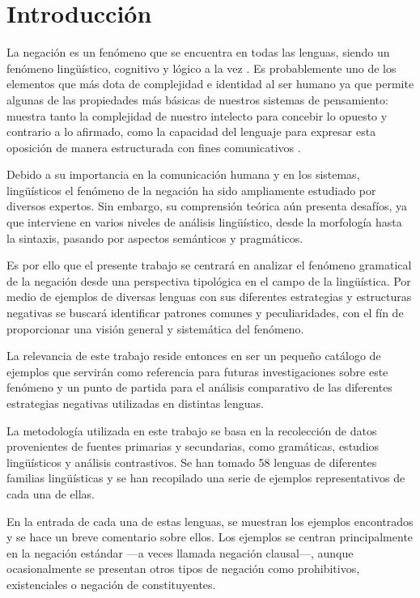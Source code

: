\section*{Introducción}

\noindent La negación es un fenómeno que se encuentra en todas las lenguas, siendo un fenómeno lingüístico, cognitivo y lógico a la vez \textcolor{MidnightBlue}{\citep{lawler}}. Es probablemente uno de los elementos que más dota de complejidad e identidad al ser humano ya que permite algunas de las propiedades más básicas de nuestros sistemas de pensamiento: muestra tanto la complejidad de nuestro intelecto para concebir lo opuesto y contrario a lo afirmado, como la capacidad del lenguaje para expresar esta oposición de manera estructurada con fines comunicativos \textcolor{MidnightBlue}{\citep{horn,hornKato}}. 

Debido a su importancia en la comunicación humana y en los sistemas, lingüísticos el fenómeno de la negación ha sido ampliamente estudiado por diversos expertos. Sin embargo, su comprensión teórica aún presenta desafíos, ya que interviene en varios niveles de análisis lingüístico, desde la morfología hasta la sintaxis, pasando por aspectos semánticos y pragmáticos. 

Es por ello que el presente trabajo se centrará en analizar el fenómeno gramatical de la negación desde una perspectiva tipológica en el campo de la lingüística. Por medio de ejemplos de diversas lenguas con sus diferentes estrategias y estructuras negativas se buscará identificar patrones comunes y peculiaridades, con el fín de proporcionar una visión general y sistemática del fenómeno.

La relevancia de este trabajo reside entonces en ser un pequeño catálogo de ejemplos que servirán como referencia para futuras investigaciones sobre este fenómeno y un punto de partida para el análisis comparativo de las diferentes estrategias negativas utilizadas en distintas lenguas. 

La metodología utilizada en este trabajo se basa en la recolección de datos provenientes de fuentes primarias y secundarias, como gramáticas, estudios lingüísticos y análisis contrastivos. Se han tomado 58 lenguas de diferentes familias lingüísticas y se han recopilado una serie de ejemplos representativos de cada una de ellas.

En la entrada de cada una de estas lenguas, se muestran los ejemplos encontrados y se hace un breve comentario sobre ellos. Los ejemplos se centran principalmente en la negación estándar —a veces llamada negación clausal—, aunque ocasionalmente se presentan otros tipos de negación como prohibitivos, existenciales o negación de constituyentes.


